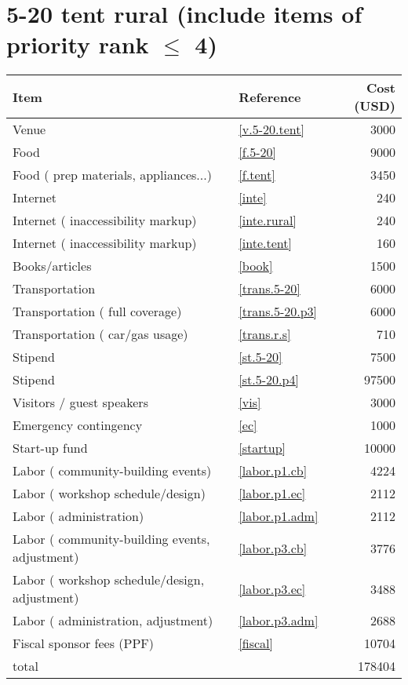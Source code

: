 \section*{5-20 tent rural (include items of priority rank $\leq$ 4)}
\begin{center}
\begin{tabular}{llr}
Item & Reference & Cost (USD) \\ \hline
Venue & \ref{v.5-20.tent} & 3000 \\
Food & \ref{f.5-20} & 9000 \\
Food ( prep materials, appliances...) & \ref{f.tent} & 3450 \\
Internet & \ref{inte} & 240 \\
Internet ( inaccessibility markup) & \ref{inte.rural} & 240 \\
Internet ( inaccessibility markup) & \ref{inte.tent} & 160 \\
Books/articles & \ref{book} & 1500 \\
Transportation & \ref{trans.5-20} & 6000 \\
Transportation ( full coverage) & \ref{trans.5-20.p3} & 6000 \\
Transportation ( car/gas usage) & \ref{trans.r.s} & 710 \\
Stipend & \ref{st.5-20} & 7500 \\
Stipend & \ref{st.5-20.p4} & 97500 \\
Visitors / guest speakers & \ref{vis} & 3000 \\
Emergency contingency & \ref{ec} & 1000 \\
Start-up fund & \ref{startup} & 10000 \\
Labor ( community-building events) & \ref{labor.p1.cb} & 4224 \\
Labor ( workshop schedule/design) & \ref{labor.p1.ec} & 2112 \\
Labor ( administration) & \ref{labor.p1.adm} & 2112 \\
Labor ( community-building events, adjustment) & \ref{labor.p3.cb} & 3776 \\
Labor ( workshop schedule/design, adjustment) & \ref{labor.p3.ec} & 3488 \\
Labor ( administration, adjustment) & \ref{labor.p3.adm} & 2688 \\
Fiscal sponsor fees (PPF) & \ref{fiscal} & 10704 \\ \hline
total &  & 178404
\end{tabular}
\end{center}
\newpage
